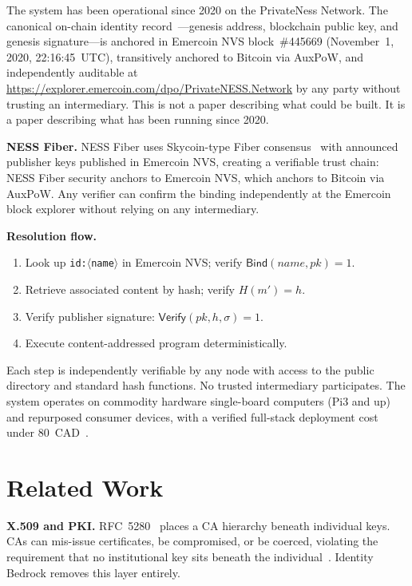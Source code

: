 \documentclass[11pt,a4paper]{article}
\begin{document}
The system has been operational since 2020 on the PrivateNess Network.  The
canonical on-chain identity record~\cite{onchain}---genesis address, blockchain
public key, and genesis signature---is anchored in Emercoin NVS block~\#445669
(November~1, 2020, 22:16:45~UTC), transitively anchored to Bitcoin via AuxPoW,
and independently auditable at
\url{https://explorer.emercoin.com/dpo/PrivateNESS.Network} by any party
without trusting an intermediary.  This is not a paper describing what could
be built.  It is a paper describing what has been running since 2020.

\textbf{NESS Fiber.}  NESS Fiber uses Skycoin-type Fiber consensus~\cite{skycoin}
with announced publisher keys published in Emercoin NVS, creating a verifiable
trust chain: NESS Fiber security anchors to Emercoin NVS, which anchors to
Bitcoin via AuxPoW.  Any verifier can confirm the binding independently at the
Emercoin block explorer without relying on any intermediary.

\textbf{Resolution flow.}
\begin{enumerate}[leftmargin=*]
  \item Look up \texttt{id:$\langle$name$\rangle$} in Emercoin NVS;
    verify $\mathsf{Bind}(\mathit{name}, pk) = 1$.
  \item Retrieve associated content by hash; verify $H(m') = h$.
  \item Verify publisher signature: $\mathsf{Verify}(pk, h, \sigma) = 1$.
  \item Execute content-addressed program deterministically.
\end{enumerate}

Each step is independently verifiable by any node with access to the public
directory and standard hash functions.  No trusted intermediary participates.
The system operates on commodity hardware single-board
computers (Pi3 and up) and repurposed consumer devices, with a verified full-stack
deployment cost under 80~CAD~\cite{onchain}.

\section{Related Work}
\label{sec:related}

\textbf{X.509 and PKI.}  RFC~5280~\cite{rfc5280} places a CA hierarchy
beneath individual keys.  CAs can mis-issue certificates, be compromised, or
be coerced, violating the requirement that no institutional key sits beneath
the individual~\cite{goldreich2001}.  Identity Bedrock removes this layer
entirely.
\end{document}

